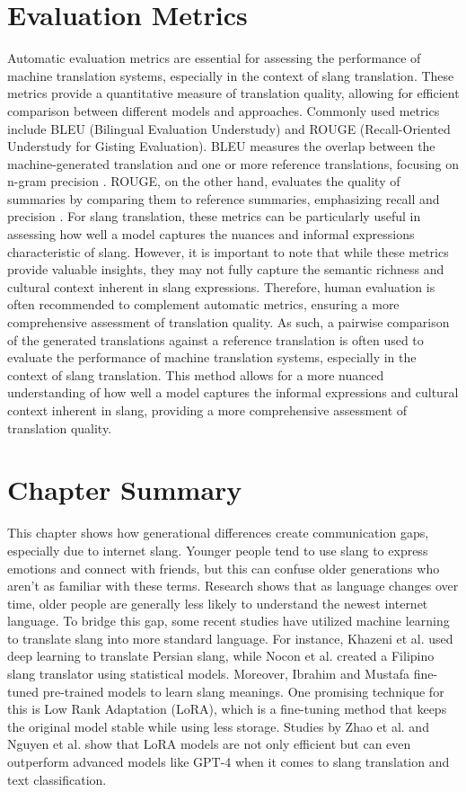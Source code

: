 \section{Evaluation Metrics}
Automatic evaluation metrics are essential for assessing the performance of machine translation systems, especially in the context of slang translation. These metrics provide a quantitative measure of translation quality, allowing for efficient comparison between different models and approaches. Commonly used metrics include BLEU (Bilingual Evaluation Understudy) and ROUGE (Recall-Oriented Understudy for Gisting Evaluation). BLEU measures the overlap between the machine-generated translation and one or more reference translations, focusing on n-gram precision \cite{papineni_roukos_ward_zhu_2001}. ROUGE, on the other hand, evaluates the quality of summaries by comparing them to reference summaries, emphasizing recall and precision \cite{lin_2004}. For slang translation, these metrics can be particularly useful in assessing how well a model captures the nuances and informal expressions characteristic of slang. However, it is important to note that while these metrics provide valuable insights, they may not fully capture the semantic richness and cultural context inherent in slang expressions. Therefore, human evaluation is often recommended to complement automatic metrics, ensuring a more comprehensive assessment of translation quality. As such, a pairwise comparison of the generated translations against a reference translation is often used to evaluate the performance of machine translation systems, especially in the context of slang translation. This method allows for a more nuanced understanding of how well a model captures the informal expressions and cultural context inherent in slang, providing a more comprehensive assessment of translation quality.

\section{Chapter Summary}
This chapter shows how generational differences create communication gaps, especially due to internet slang.
Younger people tend to use slang to express emotions and connect with friends, but this can confuse older generations who aren't as familiar with these terms.
Research shows that as language changes over time, older people are generally less likely to understand the newest internet language.
To bridge this gap, some recent studies have utilized machine learning to translate slang into more standard language.
For instance, Khazeni et al. \cite{Khazeni} used deep learning to translate Persian slang, while Nocon et al. \cite{Nocon_Kho_Arroyo_2018} created a Filipino slang translator using statistical models.
Moreover, Ibrahim and Mustafa \cite{Ibrahim_Sharief} fine-tuned pre-trained models to learn slang meanings.
One promising technique for this is Low Rank Adaptation (LoRA), which is a fine-tuning method that keeps the original model stable while using less storage.
Studies by Zhao et al. \cite{zhao2024loraland310finetuned} and Nguyen et al. \cite{nguyen2023finetuningllama2large} show that LoRA models are not only efficient but can even outperform advanced models like GPT-4 when it comes to slang translation and text classification. 
